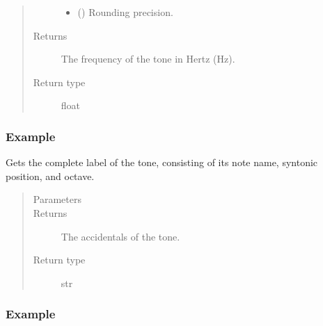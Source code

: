 \documentclass[letterpaper,10pt,english]{sphinxmanual}
\begin{document}
\begin{fulllineitems}
\begin{fulllineitems}
\begin{quote}
\begin{description}
\begin{itemize}
\item {} 
 () \textendash{} Rounding precision.

\end{itemize}

\item[{Returns}] \leavevmode
The frequency of the tone in Hertz (Hz).

\item[{Return type}] \leavevmode
float

\end{description}\end{quote}
\subsubsection*{Example}

\begin{sphinxVerbatim}[commandchars=\\\{\}]
  
\end{sphinxVerbatim}

\end{fulllineitems}



\begin{fulllineitems}
Gets the complete label of the tone, consisting of its note name, syntonic position, and octave.
\begin{quote}\begin{description}
\item[{Parameters}] \leavevmode
{} \textendash{} 

\item[{Returns}] \leavevmode
The accidentals of the tone.

\item[{Return type}] \leavevmode
str

\end{description}\end{quote}
\subsubsection*{Example}


\end{fulllineitems}
\end{fulllineitems}
\end{document}
